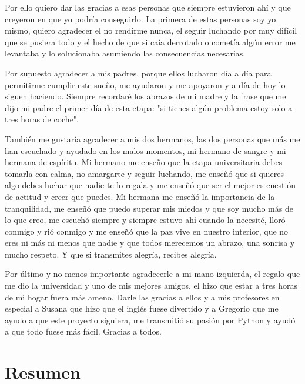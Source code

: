 \documentclass[a4paper, 12pt]{book}
\begin{document}
Por ello quiero dar las gracias a esas personas que siempre estuvieron ahí y que creyeron en que yo podría conseguirlo. La primera de estas personas soy yo mismo, quiero agradecer el no rendirme nunca, el seguir luchando por muy difícil que se pusiera todo y el hecho de que si caía derrotado o cometía algún error me levantaba y lo solucionaba asumiendo las consecuencias necesarias.

Por supuesto agradecer a mis padres, porque ellos lucharon día a día para permitirme cumplir este sueño, me ayudaron y me apoyaron y a día de hoy lo siguen haciendo. Siempre recordaré los abrazos de mi madre y la frase que me dijo mi padre el primer día de esta etapa: "si tienes algún problema estoy solo a tres horas de coche".

También me gustaría agradecer a mis dos hermanos, las dos personas que más me han escuchado y ayudado en los malos momentos, mi hermano de sangre y mi hermana de espíritu. Mi hermano me enseño que la etapa universitaria debes tomarla con calma, no amargarte y seguir luchando, me enseñó que si quieres algo debes luchar que nadie te lo regala y me enseñó que ser el mejor es cuestión de actitud y creer que puedes. Mi hermana me enseñó la importancia de la tranquilidad, me enseñó que puedo superar mis miedos y que soy mucho más de lo que creo, me escuchó siempre y siempre estuvo ahí cuando la necesité, lloró conmigo y rió conmigo y me enseñó que la paz vive en nuestro interior, que no eres ni más ni menos que nadie y que todos merecemos un abrazo, una sonrisa y mucho respeto. Y que si transmites alegría, recibes alegría.

Por último y no menos importante agradecerle a mi mano izquierda, el regalo que me dio la universidad y uno de mis mejores amigos, el hizo que estar a tres horas de mi hogar fuera más ameno. Darle las gracias a ellos y a mis profesores en especial a Susana que hizo que el inglés fuese divertido y a Gregorio que me ayudo a que este proyecto siguiera, me transmitió su pasión por Python y ayudó a que todo fuese más fácil. Gracias a todos.


\chapter*{Resumen}
\end{document}
